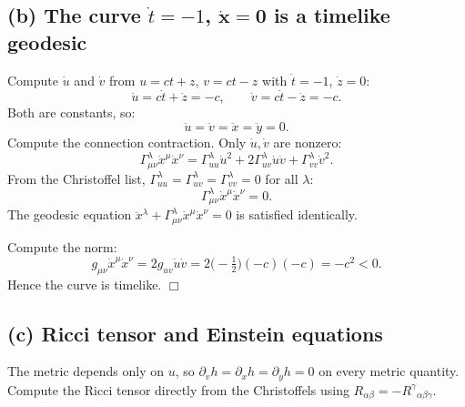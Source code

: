 \documentclass[11pt]{article}
\renewcommand{\vb}[1]{\mathbf{#1}}
\begin{document}
\subsection*{(b) The curve $\dot t=-1$, $\dot{\vb x}=\vb 0$ is a timelike geodesic}

Compute $\dot u$ and $\dot v$ from $u=ct+z$, $v=ct-z$ with $\dot t=-1$, $\dot z=0$:
\[
\dot u=c\dot t+\dot z=-c,\qquad \dot v=c\dot t-\dot z=-c.
\]
Both are constants, so:
\[
\ddot u=\ddot v=\ddot x=\ddot y=0.
\]
Compute the connection contraction. Only $\dot u,\dot v$ are nonzero:
\[
\Gamma^{\lambda}_{\mu\nu}\dot x^{\mu}\dot x^{\nu}=\Gamma^{\lambda}_{uu}\dot u^{2}+2\Gamma^{\lambda}_{uv}\dot u\dot v+\Gamma^{\lambda}_{vv}\dot v^{2}.
\]
From the Christoffel list, $\Gamma^{\lambda}_{uu}=\Gamma^{\lambda}_{uv}=\Gamma^{\lambda}_{vv}=0$ for all $\lambda$:
\[
\Gamma^{\lambda}_{\mu\nu}\dot x^{\mu}\dot x^{\nu}=0.
\]
The geodesic equation $\ddot x^{\lambda}+\Gamma^{\lambda}_{\mu\nu}\dot x^{\mu}\dot x^{\nu}=0$ is satisfied identically.

Compute the norm:
\[
g_{\mu\nu}\dot x^{\mu}\dot x^{\nu}=2g_{uv}\dot u\dot v=2\bigl(-\tfrac{1}{2}\bigr)(-c)(-c)=-c^{2}<0.
\]
Hence the curve is timelike. $\Box$

\subsection*{(c) Ricci tensor and Einstein equations}

The metric depends only on $u$, so $\partial_{v}h=\partial_{x}h=\partial_{y}h=0$ on every metric quantity.  Compute the Ricci tensor directly from the Christoffels using $R_{\alpha\beta}=-R^{\gamma}{}_{\alpha\beta\gamma}$.
\end{document}
